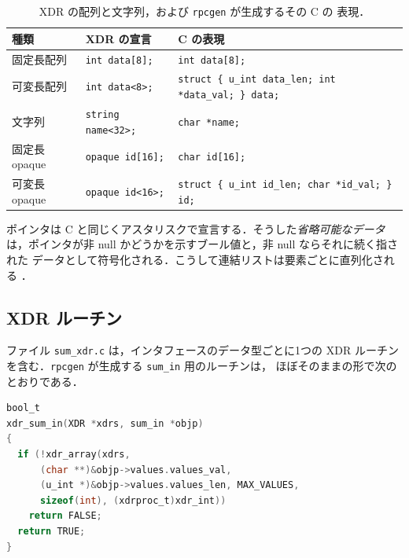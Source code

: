 \documentclass[../main.tex]{subfiles}
\begin{document}
\begin{table}[htbp]
  \centering
  \caption{XDR の配列と文字列，および \texttt{rpcgen} が生成するその C の
    表現．}
  \label{tab:l13-xdr-types}
  \small
  \begin{tabular}{@{}>{\raggedright}p{27mm}>{\raggedright}p{31mm}%
      >{\raggedright\arraybackslash}p{52mm}@{}}
    \toprule
    種類 & XDR の宣言 & C の表現 \\
    \midrule
    固定長配列 & \texttt{int data[8];} & \texttt{int data[8];} \\
    \addlinespace
    可変長配列 & \texttt{int data<8>;}
      & \texttt{struct \{ u\_int data\_len; int *data\_val; \} data;} \\
    \addlinespace
    文字列 & \texttt{string name<32>;} & \texttt{char *name;} \\
    \addlinespace
    固定長 opaque & \texttt{opaque id[16];} & \texttt{char id[16];} \\
    \addlinespace
    可変長 opaque & \texttt{opaque id<16>;}
      & \texttt{struct \{ u\_int id\_len; char *id\_val; \} id;} \\
    \bottomrule
  \end{tabular}
\end{table}

ポインタは C と同じくアスタリスクで宣言する．そうした\emph{省略可能なデータ}
は，ポインタが非 null かどうかを示すブール値と，非 null ならそれに続く指された
データとして符号化される．こうして連結リストは要素ごとに直列化される
\cite{rfc4506}．

\subsection{XDR ルーチン}

ファイル \texttt{sum\_xdr.c} は，インタフェースのデータ型ごとに1つの XDR
ルーチンを含む．\texttt{rpcgen} が生成する \texttt{sum\_in} 用のルーチンは，
ほぼそのままの形で次のとおりである．

\begin{lstlisting}[language=C, numbers=none]
bool_t
xdr_sum_in(XDR *xdrs, sum_in *objp)
{
  if (!xdr_array(xdrs,
      (char **)&objp->values.values_val,
      (u_int *)&objp->values.values_len, MAX_VALUES,
      sizeof(int), (xdrproc_t)xdr_int))
    return FALSE;
  return TRUE;
}
\end{lstlisting}
\end{document}
